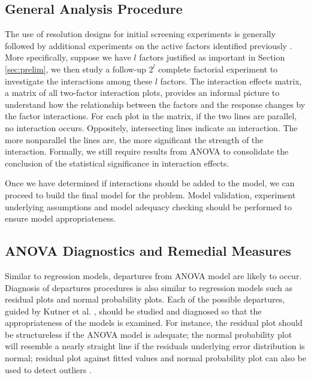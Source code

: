 \documentclass[11pt]{article}
\begin{document}
\subsection{General Analysis Procedure}\label{sec:general}
The use of resolution \MakeUppercase{} designs for initial screening experiments is generally followed by additional experiments on the active factors identified previously \cite{bk:dae1}. More specifically, suppose we have $l$ factors justified as important in Section \ref{sec:prelim}, we then study a follow-up $2^l$ complete factorial experiment to investigate the interactions among these $l$ factors. The interaction effects matrix, a matrix of all two-factor interaction plots, provides an informal picture to understand how the relationship between the factors and the response changes by the factor interactions. For each plot in the matrix, if the two lines are parallel, no interaction occurs. Oppositely, intersecting lines indicate an interaction. The more nonparallel the lines are, the more significant the strength of the interaction. Formally, we still require results from ANOVA to consolidate the conclusion of the statistical significance in interaction effects.

Once we have determined if interactions should be added to the model, we can proceed to build the final model for the problem. Model validation, experiment underlying assumptions and model adequacy checking should be performed to ensure model appropriateness.

\subsection{ANOVA Diagnostics and Remedial Measures}\label{sec:diag}
Similar to regression models, departures from ANOVA model are likely to occur. Diagnosis of departures procedures is also similar to regression models such as residual plots and normal probability plots. Each of the possible departures, guided by Kutner et al. \cite{bk:dae1}, should be studied and diagnosed so that the appropriateness of the models is examined. For instance, the residual plot should be structureless if the ANOVA model is adequate; the normal probability plot will resemble a nearly straight line if the residuals underlying error distribution is normal; residual plot against fitted values and normal probability plot can also be used to detect outliers \cite{bk:dae2}.
\end{document}
